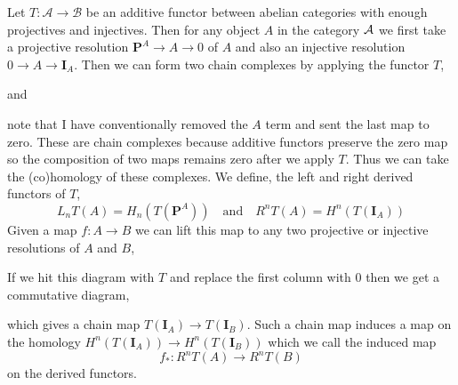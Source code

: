 \documentclass[12pt]{article}
\theoremstyle{remark}
\theoremstyle{definition}
\newenvironment{definition}[1][Definition:]{\begin{trivlist}
\item[\hskip \labelsep {\bfseries #1}]}{\end{trivlist}}
\begin{document}
\begin{definition}
Let $T : \mathcal{A} \to \mathcal{B}$ be an additive functor between abelian categories with enough projectives and injectives. Then for any object $A$ in the category $\mathcal{A}$ we first take a projective resolution $\mathbf{P}^A \to A \to 0$ of $A$ and also an injective resolution $0 \to A \to \mathbf{I}_A$. Then we can form two chain complexes by applying the functor $T$,
\begin{center}
\end{center} 
\begin{center}
and
\end{center} 
\begin{center}
\end{center} 
note that I have conventionally removed the $A$ term and sent the last map to zero.
These are chain complexes because additive functors preserve the zero map so the composition of two maps remains zero after we apply $T$. Thus we can take the (co)homology of these complexes. We define, the left and right derived functors of $T$,
\[ L_n T(A) = H_n(T(\mathbf{P}^A)) \quad \text{and} \quad R^n T(A) = H^n(T(\mathbf{I}_A)) \]
Given a map $f : A \to B$ we can lift this map to any two projective or injective resolutions of $A$ and $B$,
\begin{center}
\end{center}
If we hit this diagram with $T$ and replace the first column with $0$ then we get a commutative diagram,
\begin{center}
\end{center}
which gives a chain map $T(\mathbf{I}_A) \to T(\mathbf{I}_B)$. Such a chain map induces a map on the homology $H^n(T(\mathbf{I}_A)) \to H^n(T(\mathbf{I}_B))$ which we call the induced map
\[ f_* : R^n T(A) \to R^n T(B) \]
on the derived functors. 
\end{definition}
\end{document}
